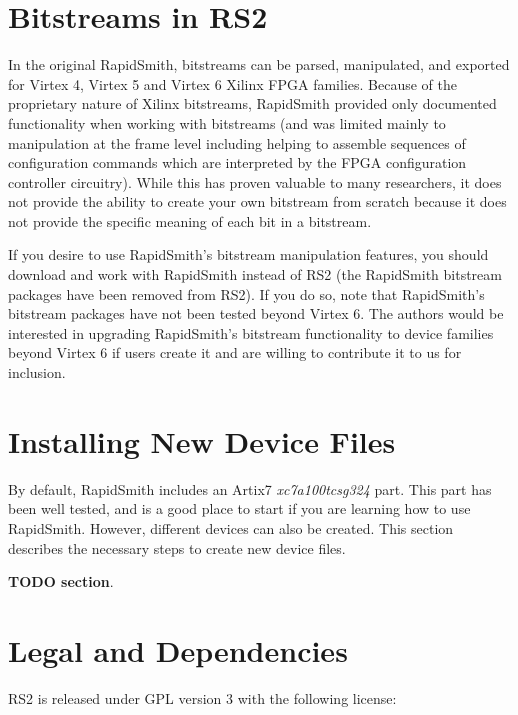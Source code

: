 \documentclass[10pt]{article}
\newcommand{\pgm}[1]{{\textbf{#1}}}
\begin{document}
\pagebreak
\section{Bitstreams in RS2}

In the original RapidSmith, bitstreams can be parsed, manipulated, and exported
for Virtex 4, Virtex 5 and Virtex 6 Xilinx FPGA families.  Because of the
proprietary nature of Xilinx bitstreams, RapidSmith provided only documented
functionality when working with bitstreams (and was limited mainly to
manipulation at the frame level including helping to assemble sequences of
configuration commands which are interpreted by the FPGA configuration
controller circuitry).  While this has proven valuable to many researchers, it
does not provide the ability to create your own bitstream from scratch because
it does not provide the specific meaning of each bit in a bitstream.

If you desire to use RapidSmith's bitstream manipulation features, you should
download and work with RapidSmith instead of RS2 (the RapidSmith bitstream
packages have been removed from RS2).  If you do so, note that RapidSmith's
bitstream packages have not been tested beyond Virtex 6.  The authors would be
interested in upgrading RapidSmith's bitstream functionality to device families
beyond Virtex 6 if users create it and are willing to contribute it to us for
inclusion.

\pagebreak
\section{Installing New Device Files}
By default, RapidSmith includes an Artix7 {\em xc7a100tcsg324} part.
This part has been well tested, and is a good place to start if you are
learning how to use RapidSmith. However, different devices can also be created.
This section describes the necessary steps to create new device files.

\pgm{TODO section}.

\pagebreak
\section{Legal and Dependencies}
RS2 is released under GPL version 3 with the following license: 
\end{document}
